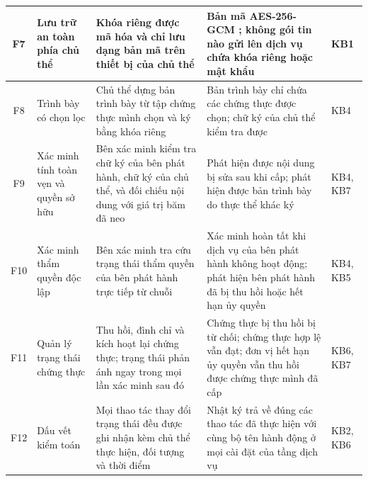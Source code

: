 \begin{longtable}{|c|p{2.6cm}|p{4.4cm}|p{4.8cm}|p{1.3cm}|}
F7 & Lưu trữ an toàn phía chủ thể
& Khóa riêng được mã hóa và chỉ lưu dạng bản mã trên thiết bị của chủ thể
& Bản mã AES-256-GCM \cite{NIST_SP800_38D}; không gói tin nào gửi lên dịch vụ chứa khóa riêng hoặc mật khẩu
& KB1 \\ \hline

F8 & Trình bày có chọn lọc
& Chủ thể dựng bản trình bày từ tập chứng thực mình chọn và ký bằng khóa riêng
& Bản trình bày chỉ chứa các chứng thực được chọn; chữ ký của chủ thể kiểm tra được
& KB4 \\ \hline

F9 & Xác minh tính toàn vẹn và quyền sở hữu
& Bên xác minh kiểm tra chữ ký của bên phát hành, chữ ký của chủ thể, và đối chiếu nội dung với giá trị băm đã neo
& Phát hiện được nội dung bị sửa sau khi cấp; phát hiện được bản trình bày do thực thể khác ký
& KB4, KB7 \\ \hline

F10 & Xác minh thẩm quyền độc lập
& Bên xác minh tra cứu trạng thái thẩm quyền của bên phát hành trực tiếp từ chuỗi
& Xác minh hoàn tất khi dịch vụ của bên phát hành không hoạt động; phát hiện bên phát hành đã bị thu hồi hoặc hết hạn ủy quyền
& KB4, KB5 \\ \hline

F11 & Quản lý trạng thái chứng thực
& Thu hồi, đình chỉ và kích hoạt lại chứng thực; trạng thái phản ánh ngay trong mọi lần xác minh sau đó
& Chứng thực bị thu hồi bị từ chối; chứng thực hợp lệ vẫn đạt; đơn vị hết hạn ủy quyền vẫn thu hồi được chứng thực mình đã cấp
& KB6, KB7 \\ \hline

F12 & Dấu vết kiểm toán
& Mọi thao tác thay đổi trạng thái đều được ghi nhận kèm chủ thể thực hiện, đối tượng và thời điểm
& Nhật ký trả về đúng các thao tác đã thực hiện với cùng bộ tên hành động ở mọi cài đặt của tầng dịch vụ
& KB2, KB6 \\ \hline

\end{longtable}
